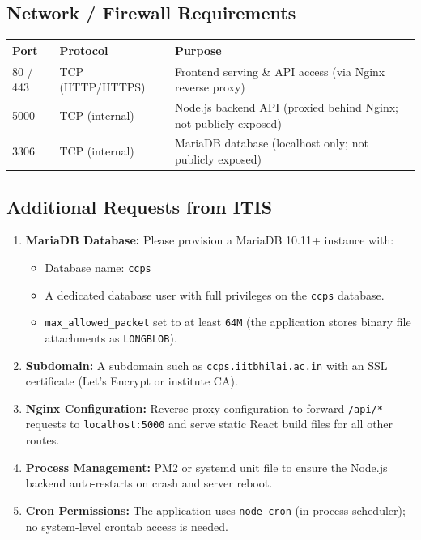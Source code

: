 \documentclass[12pt,a4paper]{article}
\begin{document}
\subsection{Network / Firewall Requirements}

\begin{longtable}{p{3cm} p{3cm} p{8cm}}
    \toprule
    \textbf{Port} & \textbf{Protocol} & \textbf{Purpose} \\
    \midrule
    \endhead
    
    80 / 443    & TCP (HTTP/HTTPS) & Frontend serving \& API access (via Nginx reverse proxy) \\
    5000        & TCP (internal)   & Node.js backend API (proxied behind Nginx; not publicly exposed) \\
    3306        & TCP (internal)   & MariaDB database (localhost only; not publicly exposed) \\
    
    \bottomrule
\end{longtable}

\subsection{Additional Requests from ITIS}

\begin{enumerate}[nosep]
    \item \textbf{MariaDB Database:} Please provision a MariaDB 10.11+ instance with:
    \begin{itemize}[nosep]
        \item Database name: \texttt{ccps}
        \item A dedicated database user with full privileges on the \texttt{ccps} database.
        \item \texttt{max\_allowed\_packet} set to at least \texttt{64M} (the application stores binary file attachments as \texttt{LONGBLOB}).
    \end{itemize}
    
    \item \textbf{Subdomain:} A subdomain such as \texttt{ccps.iitbhilai.ac.in} with an SSL certificate (Let's Encrypt or institute CA).
    
    \item \textbf{Nginx Configuration:} Reverse proxy configuration to forward \texttt{/api/*} requests to \texttt{localhost:5000} and serve static React build files for all other routes.
    
    \item \textbf{Process Management:} PM2 or systemd unit file to ensure the Node.js backend auto-restarts on crash and server reboot.
    
    \item \textbf{Cron Permissions:} The application uses \texttt{node-cron} (in-process scheduler); no system-level crontab access is needed.
\end{enumerate}
\end{document}

